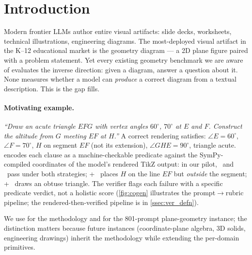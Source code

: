 \section{Introduction}
\label{sec:intro}

Modern frontier LLMs author entire visual artifacts: slide decks, worksheets, technical illustrations, engineering diagrams.
The most-deployed visual artifact in the K--12 educational market is the geometry diagram --- a 2D plane figure paired with a problem statement.
Yet every existing geometry benchmark we are aware of evaluates the inverse direction: given a diagram, answer a question about it.
None measures whether a model can \emph{produce} a correct diagram from a textual description.
This is the gap \GeoGenBench fills.

\paragraph{Motivating example.}
\textit{``Draw an acute triangle $EFG$ with vertex angles $60^\circ$, $70^\circ$ at $E$ and $F$. Construct the altitude from $G$ meeting $EF$ at $H$.''}
A correct rendering satisfies: $\angle E = 60^\circ$, $\angle F = 70^\circ$, $H$ on segment $EF$ (not its extension), $\angle GHE = 90^\circ$, triangle acute.
\GeoGenBench encodes each clause as a machine-checkable predicate against the SymPy-compiled coordinates of the model's rendered TikZ output: in our pilot, \haiku\ and \opus\ pass under both strategies; \gpt + \rawcode\ places $H$ on the line $EF$ but \emph{outside} the segment; \sonnet + \rawcode\ draws an obtuse triangle.
The verifier flags each failure with a specific predicate verdict, not a holistic score (\cref{fig:cogen} illustrates the prompt$\to$rubric pipeline; the rendered-then-verified pipeline is in \cref{ssec:ver_defn}).

We use \textbf{\GeoGen} for the methodology and \textbf{\GeoGenBench} for the 801-prompt plane-geometry instance; the distinction matters because future instances (coordinate-plane algebra, 3D solids, engineering drawings) inherit the methodology while extending the per-domain primitives.

